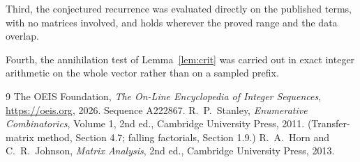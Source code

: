 \documentclass[11pt,a4paper]{article}
\theoremstyle{plain}
\theoremstyle{definition}
\begin{document}
Third, the conjectured recurrence was evaluated directly on the published terms, with no
matrices involved, and holds wherever the proved range and the data overlap.

Fourth, the annihilation test of Lemma~\ref{lem:crit} was carried out in exact integer
arithmetic on the whole vector rather than on a sampled prefix.

\begin{thebibliography}{9}
 The OEIS Foundation, \emph{The On-Line Encyclopedia of Integer
Sequences}, \url{https://oeis.org}, 2026. Sequence A222867.
 R.~P.~Stanley, \emph{Enumerative Combinatorics}, Volume 1, 2nd ed.,
Cambridge University Press, 2011. (Transfer-matrix method, Section 4.7; falling factorials,
Section 1.9.)
 R.~A.~Horn and C.~R.~Johnson, \emph{Matrix Analysis}, 2nd ed., Cambridge
University Press, 2013.
\end{thebibliography}
\end{document}
